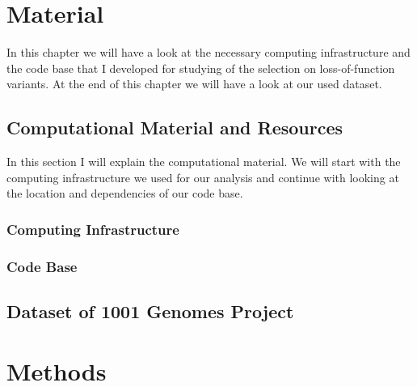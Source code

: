 \chapter{Material}
In this chapter we will have a look at the necessary computing infrastructure and the code base that I developed for studying of the selection on loss-of-function variants. At the end of this chapter we will have a look at our used dataset.
\section{Computational Material and Resources}
In this section I will explain the computational material. We will start with the computing infrastructure we used for our analysis and continue with looking at the location and dependencies of our code base.
\subsection{Computing Infrastructure}
\subsection{Code Base}
\section{Dataset of 1001 Genomes Project}
\chapter{Methods}